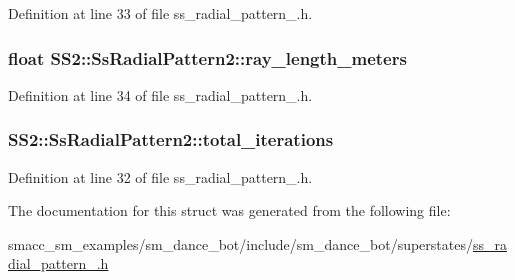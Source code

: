 Definition at line 33 of file ss\+\_\+radial\+\_\+pattern\+\_.\+h.

\subsubsection[{\texorpdfstring{ray\+\_\+length\+\_\+meters}{ray_length_meters}}]{\setlength{\rightskip}{0pt plus 5cm}float S\+S2\+::\+Ss\+Radial\+Pattern2\+::ray\+\_\+length\+\_\+meters}\hypertarget{structSS2_1_1SsRadialPattern2_a7a77597a3b1d571479a3c5d7e81f4000}{}\label{structSS2_1_1SsRadialPattern2_a7a77597a3b1d571479a3c5d7e81f4000}


Definition at line 34 of file ss\+\_\+radial\+\_\+pattern\+\_.\+h.

\subsubsection[{\texorpdfstring{total\+\_\+iterations}{total_iterations}}]{ S\+S2\+::\+Ss\+Radial\+Pattern2\+::total\+\_\+iterations}\hypertarget{structSS2_1_1SsRadialPattern2_a9a985e43f45de04a9fec87985d105a6d}{}\label{structSS2_1_1SsRadialPattern2_a9a985e43f45de04a9fec87985d105a6d}


Definition at line 32 of file ss\+\_\+radial\+\_\+pattern\+\_.\+h.



The documentation for this struct was generated from the following file\+:\begin{DoxyCompactItemize}
\item 
smacc\+\_\+sm\+\_\+examples/sm\+\_\+dance\+\_\+bot/include/sm\+\_\+dance\+\_\+bot/superstates/\hyperlink{ss__radial__pattern__2_8h}{ss\+\_\+radial\+\_\+pattern\+\_.\+h}\end{DoxyCompactItemize}
